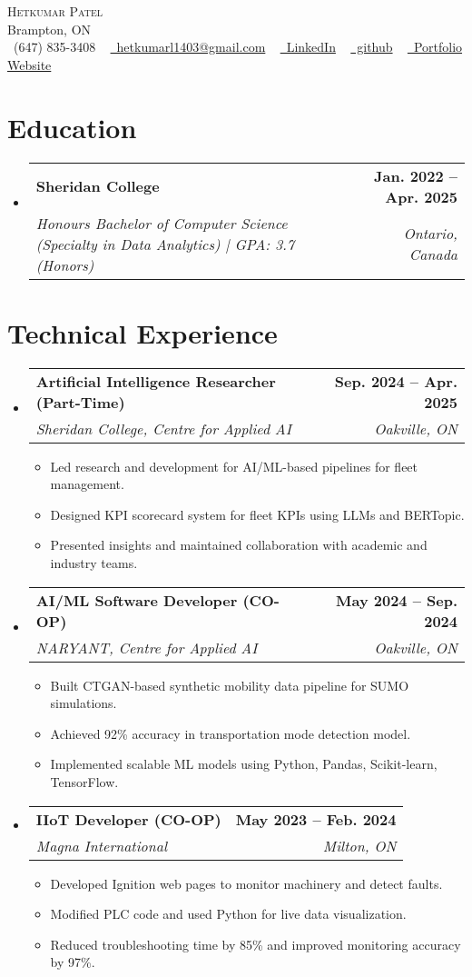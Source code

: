 \documentclass[letterpaper,11pt]{article}
\makeatletter
\newcommand{\resumeItem}[1]{\item\small{{#1 \vspace{-2pt}}}}
\newcommand{\resumeSubheading}[4]{\vspace{-2pt}\item
    \begin{tabular*}{1.0\textwidth}[t]{l@{\extracolsep{\fill}}r}
      \textbf{#1} & \textbf{\small #2} \\
      \textit{\small#3} & \textit{\small #4} \\
    \end{tabular*}\vspace{-7pt}}
\newcommand{\resumeItemListStart}{\begin{itemize}}
\newcommand{\resumeItemListEnd}{\end{itemize}\vspace{-5pt}}
\newcommand{\resumeSubHeadingListStart}{\begin{itemize}[leftmargin=0.0in, label={}]}
\newcommand{\resumeSubHeadingListEnd}{\end{itemize}}
\makeatother
\begin{document}
\begin{center}
    {\Huge \scshape Hetkumar Patel } \\ \vspace{1pt}
    Brampton, ON \\ \vspace{1pt}
    \small \faPhone\ (647) 835-3408  ~ \href{mailto:hetkumar.patel1403@gmail.com}{\faEnvelope~hetkumarl1403@gmail.com} ~ 
    \href{https://linkedin.com/in/h3t08}{\faLinkedin\ LinkedIn} ~
    \href{https://github.com/het0814}{\faGithub\ github} ~
    \href{https://het0814.github.io/}{\faGlobe~Portfolio Website}
\end{center}

\section{Education}
  \resumeSubHeadingListStart
    \resumeSubheading
      {Sheridan College}{Jan. 2022 -- Apr. 2025}
      {Honours Bachelor of Computer Science (Specialty in Data Analytics) | GPA: 3.7 (Honors)}{Ontario, Canada}
  \resumeSubHeadingListEnd

\section{Technical Experience}
  \resumeSubHeadingListStart
    \resumeSubheading
      {Artificial Intelligence Researcher (Part-Time)}{Sep. 2024 -- Apr. 2025}
      {Sheridan College, Centre for Applied AI}{Oakville, ON}
      \resumeItemListStart
        \resumeItem{Led research and development for AI/ML-based pipelines for fleet management.}
        \resumeItem{Designed KPI scorecard system for fleet KPIs using LLMs and BERTopic.}
        \resumeItem{Presented insights and maintained collaboration with academic and industry teams.}
      \resumeItemListEnd

    \resumeSubheading
      {AI/ML Software Developer (CO-OP)}{May 2024 -- Sep. 2024}
      {NARYANT, Centre for Applied AI}{Oakville, ON}
      \resumeItemListStart
        \resumeItem{Built CTGAN-based synthetic mobility data pipeline for SUMO simulations.}
        \resumeItem{Achieved 92\% accuracy in transportation mode detection model.}
        \resumeItem{Implemented scalable ML models using Python, Pandas, Scikit-learn, TensorFlow.}
      \resumeItemListEnd

    \resumeSubheading
      {IIoT Developer (CO-OP)}{May 2023 -- Feb. 2024}
      {Magna International}{Milton, ON}
      \resumeItemListStart
        \resumeItem{Developed Ignition web pages to monitor machinery and detect faults.}
        \resumeItem{Modified PLC code and used Python for live data visualization.}
        \resumeItem{Reduced troubleshooting time by 85\% and improved monitoring accuracy by 97\%.}
      \resumeItemListEnd
  \resumeSubHeadingListEnd
  
\end{document}
